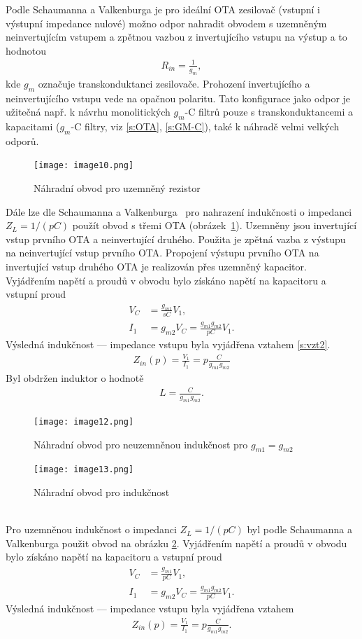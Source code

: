 \noindent Podle Schaumanna a Valkenburga \cite{13} je pro ideální OTA zesilovač (vstupní i výstupní impedance nulové) možno odpor nahradit obvodem s uzemněným neinvertujícím vstupem a zpětnou vazbou z invertujícího vstupu na výstup a to hodnotou
\begin{align}
R_{in} = \frac{1}{g_{m}},
\end{align}
kde $g_{m}$ označuje transkonduktanci zesilovače. Prohození invertujícího a neinvertujícího vstupu vede na opačnou polaritu. Tato konfigurace jako odpor je užitečná např. k návrhu monolitických $g_m$-C filtrů pouze s transkonduktancemi a kapacitami ($g_m$-C filtry, viz \ref{s:OTA}, \ref{s:GM-C}), také k náhradě velmi velkých odporů.
\begin{figure}[h]
\centering
\texttt{[image: image10.png]}
\caption[Náhradní obvod pro uzemněný rezistor]{Náhradní obvod pro uzemněný rezistor}
\end{figure}
\noindent Dále lze dle Schaumanna a Valkenburga~\cite{13} pro nahrazení indukčnosti o impedanci $Z_L = 1/(pC)$ použít obvod s třemi OTA (obrázek~\ref{s:IND0}). Uzemněny jsou invertující vstup prvního OTA a neinvertující druhého. Použita je zpětná vazba z výstupu na neinvertující vstup prvního OTA. Propojení výstupu prvního OTA na invertující vstup druhého OTA je realizován přes uzemněný kapacitor. \\
Vyjádřením napětí a proudů v obvodu bylo získáno napětí na kapacitoru a vstupní proud
\begin{align}\label{s:vzt2}
V_C &= \frac{g_{m1}}{sC}V_1, \\
I_1 &= g_{m2}V_C = \frac{g_{m1}g_{m2}}{pC}V_1.
\end{align}
Výsledná indukčnost --- impedance vstupu byla vyjádřena vztahem \ref{s:vzt2}.
\begin{align}
Z_{in}(p) = \frac{V_1}{I_1} = p\frac{C}{g_{m1}g_{m2}}
\end{align}
\noindent Byl obdržen induktor o hodnotě
\begin{align}
L = \frac{C}{g_{m1}g_{m2}}.
\end{align}
\begin{figure}[h]
\centering
\texttt{[image: image12.png]}
\caption[Náhradní obvod pro neuzemněnou indukčnost]{Náhradní obvod pro neuzemněnou indukčnost pro $g_{m1} = g_{m2}$ \label{s:IND0}}
\end{figure}
\begin{figure}[h]
\centering
\texttt{[image: image13.png]}
\caption[Náhradní obvod pro indukčnost]{Náhradní obvod pro indukčnost \label{s:IND}}
\end{figure}
\\
\noindent Pro uzemněnou indukčnost o impedanci $Z_L = 1/(pC)$ byl podle Schaumanna a Valkenburga \cite{13} použit obvod na obrázku \ref{s:IND}. Vyjádřením napětí a proudů v obvodu bylo získáno napětí na kapacitoru a vstupní proud
\begin{align}
V_C &= \frac{g_{m1}}{pC}V_1, \\
I_1 &= g_{m2}V_C = \frac{g_{m1}g_{m2}}{pC}V_1.
\end{align}
Výsledná indukčnost --- impedance vstupu byla vyjádřena vztahem
\begin{align}
Z_{in}(p) = \frac{V_1}{I_1} = p\frac{C}{g_{m1}g_{m2}}.
\end{align}
